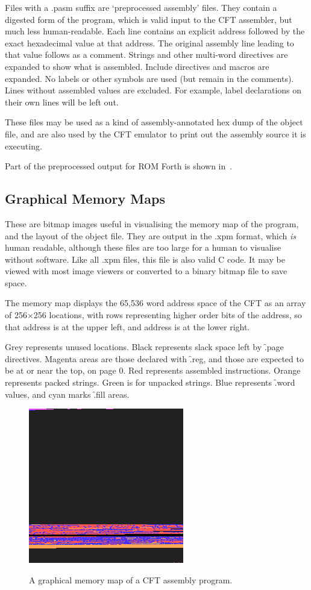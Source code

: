 Files with a {\ttfamily .pasm} suffix are ‘preprocessed assembly’ files. They contain
a digested form of the program, which is valid input to the CFT assembler, but
much less human-readable. Each line contains an explicit address followed by
the exact hexadecimal value at that address. The original assembly line leading
to that value follows as a comment. Strings and other multi-word directives are
expanded to show what is assembled. Include directives and macros are
expanded. No labels or other symbols are used (but remain in the
comments). Lines without assembled values are excluded. For example, label
declarations on their own lines will be left out.

These files may be used as a kind of assembly-annotated hex dump of the object
file, and are also used by the CFT emulator to print out the assembly source it
is executing.

Part of the preprocessed output for ROM Forth is shown in~.


\subsection{Graphical Memory Maps}

These are bitmap images useful in visualising the memory map of the program,
and the layout of the object file. They are output in the {\ttfamily .xpm} format,
which {\em is\/} human readable, although these files are too large for a human
to visualise without software. Like all {\ttfamily .xpm} files, this file is also
valid C code. It may be viewed with most image viewers or converted to a binary
bitmap file to save space.

The memory map displays the 65,536 word address space of the CFT as an array of
256×256 locations, with rows representing higher order bits of the address, so
that address  is at the upper left, and address  is at the
lower right.

Grey represents unused locations. Black represents slack space left by
\f{.page} directives. Magenta areas are those declared with \f{.reg}, and those
are expected to be at or near the top, on page 0. Red represents assembled
instructions. Orange represents packed strings. Green is for unpacked
strings. Blue represents \f{.word} values, and cyan marks \f{.fill} areas.

\begin{figure}[t]
\centering
\includegraphics[width=0.5\columnwidth]{figs/forth.png}\\
\caption{\label{fig-graphical-map}A graphical memory map of a CFT assembly program.}
\end{figure}
